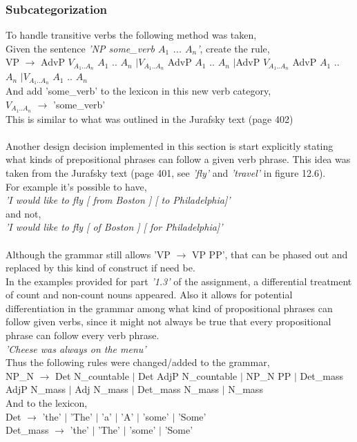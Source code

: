\documentclass{article}
\begin{document}
\subsubsection{Subcategorization}
To handle transitive verbs the following method was taken,\\
Given the sentence \textit{'NP some\_verb $A_1$ ... $A_n$'}, create the rule,\\
\tiny
VP $\rightarrow$ AdvP $V_{A_1..A_n}$ $A_1$ .. $A_n$ $|$$V_{A_1..A_n}$  AdvP $A_1$ .. $A_n$ $|$AdvP $V_{A_1..A_n}$  AdvP $A_1$ .. $A_n$ $|$$V_{A_1..A_n}$ $A_1$ .. $A_n$
\normalsize \\
And add 'some\_verb' to the lexicon in this new verb category,\\
\tiny
$V_{A_1..A_n}$ $\rightarrow$ 'some\_verb'
\normalsize \\
This is similar to what was outlined in the Jurafsky text (page 402) \\ \\
Another design decision implemented in this section is start explicitly stating what kinds of prepositional phrases can follow a given verb phrase. This idea was taken from the Jurafsky text (page 401, see \textit{'fly'} and \textit{'travel'} in figure 12.6). \\ For example it's possible to have,\\
\textit{'I would like to fly [ from Boston ] [ to Philadelphia]'}\\
and not,\\
\textit{'I would like to fly [ of Boston ] [ for Philadelphia]'}\\
\\
Although the grammar still allows 'VP $\rightarrow$ VP PP', that can be phased out and replaced by this kind of construct if need be. \\
In the examples provided for part \textit{'1.3'} of the assignment, a differential treatment of count and non-count nouns appeared. Also it allows for potential differentiation in the grammar among what kind of propositional phrases can follow given verbs, since it might not always be true that every propositional phrase can follow every verb phrase. \\
\textit{'Cheese was always on the menu'}\\
Thus the following rules were changed/added to the grammar, \\
\tiny
NP\_N $\rightarrow$ Det N\_countable $|$ Det AdjP N\_countable $|$ NP\_N PP $|$ Det\_mass AdjP N\_mass $|$ Adj N\_mass $|$ Det\_mass N\_mass $|$ N\_mass\\
And to the lexicon,\\
Det $\rightarrow$ 'the' $|$ 'The' $|$ 'a' $|$ 'A' $|$ 'some' $|$ 'Some'\\
Det\_mass $\rightarrow$ 'the' $|$ 'The' $|$ 'some' $|$ 'Some' 
\normalsize \\
\end{document}
